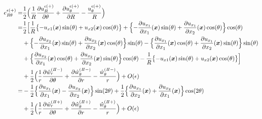 \begin{align}
	e_{R\theta}^{\epsilon(+)}
		=&\frac{1}{2}\Bigl( \frac{1}{R}\frac{\partial u_{R}^{\epsilon(+)}}{\partial \theta}
			+\frac{\partial u_{\theta}^{\epsilon(+)}}{\partial R}-\frac{u_{\theta}^{\epsilon(+)}}{R}\Bigr)
		\nonumber
		\\
		=&\frac{1}{2}\Bigl[ \frac{1}{R}\bigl\{-u_{x1}(\bm{x})\sin(\theta)
				+u_{x2}(\bm{x})\cos(\theta)\bigr\}
			+\Bigl\{ -\frac{\partial u_{x_{1}}}{\partial x_{1}}(\bm{x})\sin(\theta)
				+\frac{\partial u_{x_{1}}}{\partial x_{2}}(\bm{x})\cos(\theta)\Bigr\}\cos(\theta)
			\nonumber
			\\
			&+\Bigl\{ -\frac{\partial u_{x_{2}}}{\partial x_{1}}(\bm{x})\sin(\theta)
				+\frac{\partial u_{x_{2}}}{\partial x_{2}}(\bm{x})\cos(\theta)\Bigr\}\sin(\theta)
			-\Bigl\{ \frac{\partial u_{x_{1}}}{\partial x_{1}}(\bm{x})\cos(\theta)
				+\frac{\partial u_{x_{1}}}{\partial x_{2}}(\bm{x})\sin(\theta)\Bigr\}\sin(\theta)
			\nonumber
			\\
			&+\Bigl\{ \frac{\partial u_{x_{2}}}{\partial x_{1}}(\bm{x})\cos(\theta)
				+\frac{\partial u_{x_{2}}}{\partial x_{2}}(\bm{x})\sin(\theta)\Bigr\}\cos(\theta)
			-\frac{1}{R}\bigl\{-u_{x1}(\bm{x})\sin(\theta)+u_{x2}(\bm{x})\cos(\theta)\bigr\}\Bigr]
			\nonumber
			\\
		&+\frac{1}{2}\Bigl( \frac{1}{r}\frac{\partial \hat{w}_{r}^{(I\hspace{-.15em}I-)}}{\partial \theta}
			+\frac{\partial \hat{w}_{\theta}^{(I\hspace{-.15em}I-)}}{\partial r}
			-\frac{\hat{w}_{\theta}^{(I\hspace{-.15em}I-)}}{r}\Bigr)+O(\epsilon)
		\nonumber
		\\
		=&-\frac{1}{2}\Bigl\{ \frac{\partial u_{x_{1}}}{\partial x_{1}}(\bm{x})
			-\frac{\partial u_{x_{2}}}{\partial x_{2}}(\bm{x})\Bigr\}\sin(2\theta)
		+\frac{1}{2}\Bigl\{ \frac{\partial u_{x_{1}}}{\partial x_{2}}(\bm{x})
			+\frac{\partial u_{x_{2}}}{\partial x_{1}}(\bm{x})\Bigr\}\cos(2\theta)
			\nonumber
			\\
		&+\frac{1}{2}\Bigl( \frac{1}{r}\frac{\partial \hat{w}_{r}^{(I\hspace{-.15em}I+)}}{\partial \theta}
			+\frac{\partial \hat{w}_{\theta}^{(I\hspace{-.15em}I+)}}{\partial r}
			-\frac{\hat{w}_{\theta}^{(I\hspace{-.15em}I+)}}{r}\Bigr)+O(\epsilon)
\end{align}
